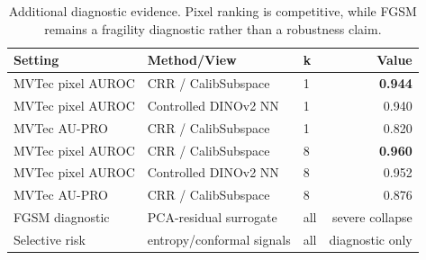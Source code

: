 \begin{table}[t]
\centering
\caption{Additional diagnostic evidence. Pixel ranking is competitive, while FGSM remains a fragility diagnostic rather than a robustness claim.}
\label{tab:pixel-diagnostics}
\footnotesize
\begin{tabular}{lllr}
\toprule
Setting & Method/View & k & Value \\
\midrule
MVTec pixel AUROC & CRR / CalibSubspace & 1 & \textbf{0.944} \\
MVTec pixel AUROC & Controlled DINOv2 NN & 1 & 0.940 \\
MVTec AU-PRO & CRR / CalibSubspace & 1 & 0.820 \\
MVTec pixel AUROC & CRR / CalibSubspace & 8 & \textbf{0.960} \\
MVTec pixel AUROC & Controlled DINOv2 NN & 8 & 0.952 \\
MVTec AU-PRO & CRR / CalibSubspace & 8 & 0.876 \\
FGSM diagnostic & PCA-residual surrogate & all & severe collapse \\
Selective risk & entropy/conformal signals & all & diagnostic only \\
\bottomrule
\end{tabular}
\end{table}
